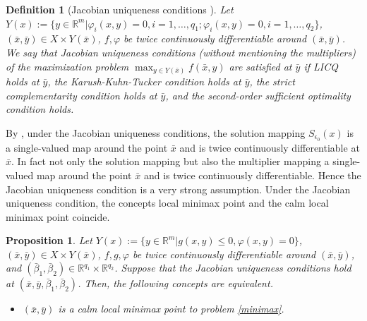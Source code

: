 \documentclass[11pt]{article}
\numberwithin{equation}{section}
\newtheorem{definition}{Definition}[section]
\newtheorem{proposition}{Proposition}[section]
\begin{document}
{\begin{definition}[Jacobian uniqueness conditions ]
Let $Y(x):=\{y \in \mathbb{R}^m|\varphi_i(x,y)=0, i=1,\dots, q_1; \varphi_i(x,y)=0,i=1,\dots, q_2\}$, $(\bar x,\bar y) \in X \times Y(\bar x)$, $f, \varphi$ be twice continuously differentiable around $(\bar x,\bar y)$.
 We say that Jacobian uniqueness conditions (without mentioning the multipliers)  of the maximization problem  $\max_{y\in Y(\bar x)} f(\bar x,y)$ are satisfied at 
 $\bar y$ 
 if  LICQ holds at $\bar y$, the Karush-Kuhn-Tucker condition holds at $\bar y$, the strict complementarity condition holds at $\bar y$, and the second-order sufficient optimality condition holds.
\end{definition}
By \cite[Lemma 2.1]{DaiZh-2020}, under the Jacobian uniqueness conditions, the solution mapping $S_{\epsilon_0}(x)$ is a single-valued map around the point $\bar x$ and  is twice continuously differentiable at $\bar x$. In fact not only the solution mapping but also the multiplier mapping a single-valued map around the point $\bar x$ and  is twice continuously differentiable. Hence  the Jacobian uniqueness condition is a very strong assumption. Under the Jacobian uniqueness condition, the concepts local minimax point and the calm local minimax point coincide.
\begin{proposition}\label{prop4.1}
Let $Y(x):=\{y \in \mathbb{R}^m|g(x,y)\leq 0, \varphi(x,y)=0\}$, $(\bar x,\bar y) \in X \times Y(\bar x)$, $f,g,\varphi$ be twice continuously differentiable around $(\bar x,\bar y)$, and $\left(\bar \beta_1, \bar \beta_2 \right) \in \mathbb{R}^{q_1} \times \mathbb{R}^{q_2}$. Suppose that the Jacobian uniqueness conditions hold at $(\bar x,\bar y,\bar \beta_1,\bar \beta_2)$. Then, the following concepts are equivalent.
\begin{itemize}
\item[(i)] $(\bar x,\bar y)$ is a calm local minimax point to problem \eqref{minimax}.



\end{itemize}
\end{proposition}}
\end{document}
